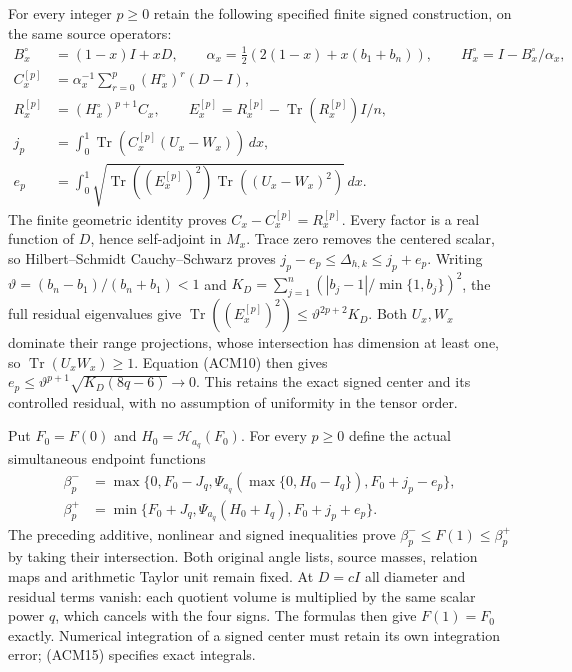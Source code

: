 For every integer $p\geq0$ retain the following specified finite
signed construction, on the same source operators:
\[
\begin{split}
 B_x^\circ&=(1-x)I+xD,\qquad
 \alpha_x=\tfrac12(2(1-x)+x(b_1+b_n)),\qquad
 H_x^\circ=I-B_x^\circ/\alpha_x,\\
 C_x^{[p]}&=\alpha_x^{-1}\sum_{r=0}^p(H_x^\circ)^r(D-I),\\
 R_x^{[p]}&=(H_x^\circ)^{p+1}C_x,
 \qquad E_x^{[p]}=R_x^{[p]}-\operatorname{Tr}(R_x^{[p]})I/n,\\
 j_p&=\int_0^1\operatorname{Tr}(C_x^{[p]}(U_x-W_x))\,dx,\\
 e_p&=\int_0^1\sqrt{\operatorname{Tr}((E_x^{[p]})^2)
                         \operatorname{Tr}((U_x-W_x)^2)}\,dx.
\end{split}
\tag{ACM15}
\]
The finite geometric identity proves $C_x-C_x^{[p]}=R_x^{[p]}$.
Every factor is a real function of $D$, hence self-adjoint in $M_x$.
Trace zero removes the centered scalar, so Hilbert--Schmidt
Cauchy--Schwarz proves $j_p-e_p\leq\Delta_{h,k}\leq j_p+e_p$.
Writing $\vartheta=(b_n-b_1)/(b_n+b_1)<1$ and
$K_D=\sum_{j=1}^n(|b_j-1|/\min\{1,b_j\})^2$, the full residual
eigenvalues give
$\operatorname{Tr}((E_x^{[p]})^2)\leq\vartheta^{2p+2}K_D$.
Both $U_x,W_x$ dominate their range projections, whose intersection
has dimension at least one, so $\operatorname{Tr}(U_xW_x)\geq1$.
Equation (ACM10) then gives
$e_p\leq\vartheta^{p+1}\sqrt{K_D(8q-6)}\to0$.
This retains the exact signed center and its controlled residual,
with no assumption of uniformity in the tensor order.

Put $F_0=F(0)$ and $H_0=\mathscr H_{a_q}(F_0)$. For every $p\geq0$
define the actual simultaneous endpoint functions
\[
\begin{split}
 \beta_p^-&=\max\{0,F_0-J_q,
       \Psi_{a_q}(\max\{0,H_0-I_q\}),F_0+j_p-e_p\},\\
 \beta_p^+&=\min\{F_0+J_q,
       \Psi_{a_q}(H_0+I_q),F_0+j_p+e_p\}.
\end{split}
\tag{ACM16}
\]
The preceding additive, nonlinear and signed inequalities prove
$\beta_p^-\leq F(1)\leq\beta_p^+$ by taking their intersection.
Both original angle lists, source masses, relation maps and arithmetic
Taylor unit remain fixed. At $D=cI$ all diameter and residual terms
vanish: each quotient volume is multiplied by the same scalar power
$q$, which cancels with the four signs. The formulas then give
$F(1)=F_0$ exactly. Numerical integration of a signed center must
retain its own integration error; (ACM15) specifies exact integrals.


